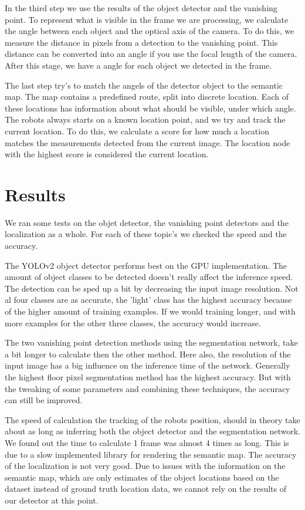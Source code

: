 In the third step we use the results of the object detector and the vanishing point.
To represent what is visible in the frame we are processing, we calculate the angle between each object and the optical axis of the camera.
To do this, we measure the distance in pixels from a detection to the vanishing point.
This distance can be converted into an angle if you use the focal length of the camera.
After this stage, we have a angle for each object we detected in the frame.

The last step try's to match the angels of the detector object to the semantic map.
The map contains a predefined route, split into discrete location.
Each of these locations has information about what should be visible, under which angle.
The robots always starts on a known location point, and we try and track the current location.
To do this, we calculate a score for how much a location matches the measurements detected from the current image.
The location node with the highest score is considered the current location.

\section*{Results}
We ran some tests on the objet detector, the vanishing point detectors and the localization as a whole.
For each of these topic's we checked the speed and the accuracy.

The YOLOv2 object detector performs best on the GPU implementation.
The amount of object classes to be detected doesn't really affect the inference speed.
The detection can be sped up a bit by decreasing the input image resolution.
Not al four classes are as accurate, the 'light' class has the highest accuracy because of the higher amount of training examples.
If we would training longer, and with more examples for the other three classes, the accuracy would increase.

The two vanishing point detection methods using the segmentation network, take a bit longer to calculate then the other method.
Here also, the resolution of the input image has a big influence on the inference time of the network.
Generally the highest floor pixel segmentation method has the highest accuracy.
But with the tweaking of some parameters and combining these techniques, the accuracy can still be improved.

The speed of calculation the tracking of the robots position, should in theory take about as long as inferring both the
object detector and the segmentation network.
We found out the time to calculate 1 frame was almost 4 times as long.
This is due to a slow implemented library for rendering the semantic map.
The accuracy of the localization is not very good.
Due to issues with the information on the semantic map, which are only estimates of the object locations based on the dataset instead of
ground truth location data, we cannot rely on the results of our detector at this point.

